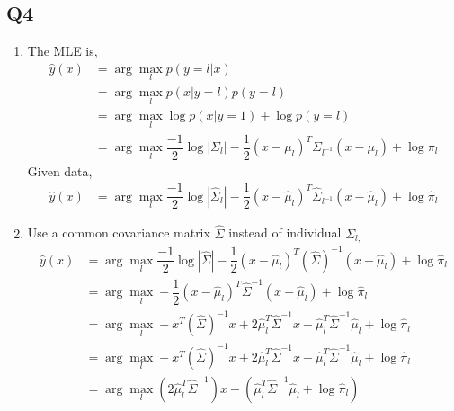 \documentclass{article}
\begin{document}
\subsection{Q4}

\begin{enumerate}
\item The MLE is,
\begin{align*}
\hat{y}\left(x\right) &= \arg\displaystyle\max_{l} p\left(y = l | x \right)
\\ &= \arg\displaystyle\max_{l} p\left(x | y = l\right) p\left(y = l \right)
\\ &= \arg\displaystyle\max_{l} \log p\left(x | y = 1\right) + \log p\left(y = l \right)
\\ &= \arg\displaystyle\max_{l} \dfrac{-1}{2} \log | \Sigma_{l} | - \dfrac{1}{2} \left(x - \mu_{l}\right)^{T} \Sigma_{l^{-1}} \left(x - \mu_{l}\right) + \log \pi_{l}
\end{align*}
Given data,
\begin{align*}
\hat{y}\left(x\right) &= \arg\displaystyle\max_{l} \dfrac{-1}{2} \log | \hat{\Sigma}_{l} | - \dfrac{1}{2} \left(x - \hat{\mu}_{l}\right)^{T} \hat{\Sigma}_{l^{-1}} \left(x - \hat{\mu}_{l}\right) + \log \hat{\pi}_{l}
\end{align*}
\item Use a common covariance matrix $\hat{\Sigma}$ instead of individual $\Sigma_{l,}$
\begin{align*}
\hat{y}\left(x\right) &= \arg\displaystyle\max_{l} \dfrac{-1}{2} \log | \hat{\Sigma} | - \dfrac{1}{2} \left(x - \hat{\mu}_{l}\right)^{T} \left(\hat{\Sigma}\right)^{-1} \left(x - \hat{\mu}_{l}\right) + \log \hat{\pi}_{l}
\\ &= \arg\displaystyle\max_{l} - \dfrac{1}{2} \left(x - \hat{\mu}_{l}\right)^{T} \hat{\Sigma}^{-1} \left(x - \hat{\mu}_{l}\right) + \log \hat{\pi}_{l}
\\ &= \arg\displaystyle\max_{l} - x^{T} \left(\hat{\Sigma}\right)^{-1} x + 2 \hat{\mu}^{T}_{l} \hat{\Sigma}^{-1} x - \hat{\mu}^{T}_{l} \hat{\Sigma}^{-1} \hat{\mu}_{l} + \log \hat{\pi}_{l}
\\ &= \arg\displaystyle\max_{l} - x^{T} \left(\hat{\Sigma}\right)^{-1} x + 2 \hat{\mu}^{T}_{l} \hat{\Sigma}^{-1} x - \hat{\mu}^{T}_{l} \hat{\Sigma}^{-1} \hat{\mu}_{l} + \log \hat{\pi}_{l}
\\ &= \arg\displaystyle\max_{l} \left(2 \hat{\mu}^{T}_{l} \hat{\Sigma}^{-1}\right) x - \left(\hat{\mu}^{T}_{l} \hat{\Sigma}^{-1} \hat{\mu}_{l} + \log \hat{\pi}_{l}\right)
\end{align*}
\end{enumerate}
\end{document}
